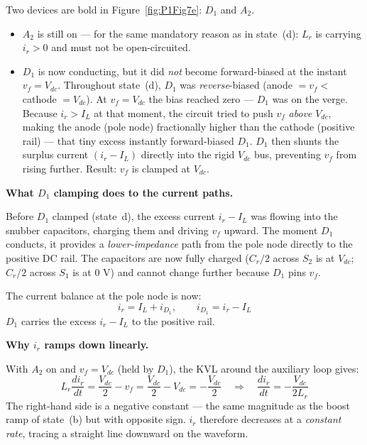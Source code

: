 \documentclass[12pt, a4paper]{article}
\def\,{ }%
\newcommand{\Vdc}{V_{dc}}
\newcommand{\vf}{v_f}
\newcommand{\ir}{i_r}
\newcommand{\IL}{I_L}
\newcommand{\Lr}{L_r}
\newcommand{\Cr}{C_r}
\newcommand{\figref}[1]{Figure~\ref{#1}}
\begin{document}
Two devices are bold in \figref{fig:P1Fig7e}: $D_1$ and $A_2$.
\begin{itemize}
    \item $A_2$ is still on --- for the same mandatory reason as in
          state~(d): $\Lr$ is carrying $\ir > 0$ and must not be
          open-circuited.
    \item $D_1$ is now conducting, but it did \emph{not} become
          forward-biased at the instant $\vf = \Vdc$.
          Throughout state~(d), $D_1$ was \emph{reverse}-biased
          (anode $= \vf <$ cathode $= \Vdc$).
          At $\vf = \Vdc$ the bias reached zero — $D_1$ was on the verge.
          Because $\ir > \IL$ at that moment, the circuit tried to push
          $\vf$ \emph{above} $\Vdc$, making the anode (pole node)
          fractionally higher than the cathode (positive rail) — that tiny
          excess instantly forward-biased $D_1$.
          $D_1$ then shunts the surplus current $(\ir - \IL)$ directly
          into the rigid $\Vdc$ bus, preventing $\vf$ from rising further.
          Result: $\vf$ is clamped at $\Vdc$.
\end{itemize}

\medskip
\textbf{What $D_1$ clamping does to the current paths.}

Before $D_1$ clamped (state~d), the excess current $\ir - \IL$ was
flowing into the snubber capacitors, charging them and driving $\vf$
upward.
The moment $D_1$ conducts, it provides a \emph{lower-impedance} path
from the pole node directly to the positive DC rail.
The capacitors are now fully charged ($\Cr/2$ across $S_2$ is at $\Vdc$;
$\Cr/2$ across $S_1$ is at 0\,V) and cannot change further because
$D_1$ pins $\vf$.

The current balance at the pole node is now:
\begin{equation}
    \ir = \IL + i_{D_1}, \qquad
    i_{D_1} = \ir - \IL
    \label{eq:stateE_kcl}
\end{equation}
$D_1$ carries the excess $\ir - \IL$ to the positive rail.

\medskip
\textbf{Why $\ir$ ramps down linearly.}

With $A_2$ on and $\vf = \Vdc$ (held by $D_1$), the KVL around the
auxiliary loop gives:
\begin{equation}
    \Lr\,\frac{d\ir}{dt} = \frac{\Vdc}{2} - \vf
                         = \frac{\Vdc}{2} - \Vdc
                         = -\frac{\Vdc}{2}
    \quad\Longrightarrow\quad
    \frac{d\ir}{dt} = -\frac{\Vdc}{2\Lr}
    \label{eq:ir_rampdown}
\end{equation}
The right-hand side is a negative constant --- the same magnitude as the
boost ramp of state~(b) but with opposite sign.
$\ir$ therefore decreases at a \emph{constant rate}, tracing a straight
line downward on the waveform.
\end{document}
